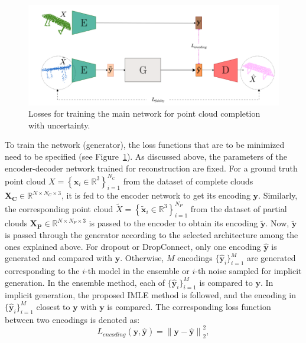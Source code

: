         \begin{figure}[htb]
          \begin{center}
          \includegraphics[width=\linewidth]{figures/losses_main_network.png}
          \end{center}
          \caption{Losses for training the main network for point cloud completion with uncertainty.}\label{fig:losses_main}
        \end{figure}
        To train the network (generator), the loss functions that are to be minimized need to be specified (see Figure~\ref{fig:losses_main}). As discussed above, the parameters of the encoder-decoder network trained for reconstruction are fixed. For a ground truth point cloud $X=\left\{\mathbf{x}_{i} \in \mathbb{R}^{3}\right\}_{i=1}^{N_C}$ from the dataset of complete clouds $\mathbf{X_C} \in \mathbb{R}^{N \times N_C \times 3}$, it is fed to the encoder network to get its encoding $\mathbf{y}$. Similarly, the corresponding point cloud $\tilde{X}=\left\{\mathbf{\tilde{x}}_{i} \in \mathbb{R}^{3}\right\}_{i=1}^{N_P}$ from the dataset of partial clouds $\mathbf{X_P} \in \mathbb{R}^{N \times N_P \times 3}$ is passed to the encoder to obtain its encoding $\mathbf{\tilde{y}}$. Now, $\mathbf{\tilde{y}}$ is passed through the generator according to the selected architecture among the ones explained above. For dropout or DropConnect, only one encoding $\mathbf{\hat{y}}$ is generated and compared with $\mathbf{y}$. Otherwise, $M$ encodings $\{\mathbf{\hat{y}}_i\}_{i=1}^M$ are generated corresponding to the $i$-th model in the ensemble or $i$-th noise sampled for implicit generation. In the ensemble method, each of $\{\mathbf{\hat{y}}_i\}_{i=1}^M$ is compared to $\mathbf{y}$. In implicit generation, the proposed IMLE method is followed, and the encoding in $\{\mathbf{\hat{y}}_i\}_{i=1}^M$ closest to $\mathbf{y}$ with $\mathbf{y}$ is compared. The corresponding loss function between two encodings is denoted as:
        \begin{equation}\label{latent_loss}
            L_{encoding}(\mathbf{y}, \mathbf{\hat{y}}) = \left\|\mathbf{y} - \mathbf{\hat{y}}\right\|_2^2,
        \end{equation}
